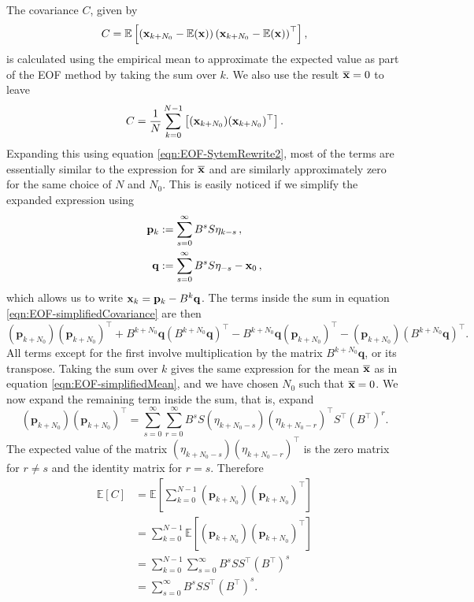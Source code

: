 The covariance $C$, given by 
\begin{align}
C = \mathbb{E}\left[ \left(\mathbf{x}_{k+N_0} - \mathbb{E}(\mathbf{x}) \right) \left(\mathbf{x}_{k+N_0} - \mathbb{E}(\mathbf{x}) \right)^\top \right],
\end{align}
is calculated using the empirical mean to approximate the expected value as part of the EOF method by taking the sum over $k$. We also use the result $\overline{\mathbf{x}}=0$ to leave
\begin{equation}
C = \frac{1}{N}\sum_{k=0}^{N-1}\left[ (\mathbf{x}_{k+N_0})(\mathbf{x}_{k+N_0})^\top \right].
\label{eqn:EOF-simplifiedCovariance}
\end{equation}
Expanding this using equation \ref{eqn:EOF-SytemRewrite2}, most of the terms are essentially similar to the expression for $\overline{\mathbf{x}}$ and are similarly approximately zero for the same choice of $N$ and $N_0$. This is easily noticed if we simplify the expanded expression using
\begin{align}
\mathbf{p}_k &:= \sum_{s=0}^{\infty} B^{s} S \mathbf{\eta}_{k-s}\,,\\
\mathbf{q} &:= \sum_{s=0}^{\infty} B^{s} S \mathbf{\eta}_{-s} - \mathbf{x}_0\,,
\end{align}
which allows us to write $\mathbf{x}_k = \mathbf{p}_k - B^k\mathbf{q}$. The terms inside the sum in equation \ref{eqn:EOF-simplifiedCovariance} are then
\begin{equation}
(\mathbf{p}_{k+N_0})(\mathbf{p}_{k+N_0})^\top + B^{k+N_0}\mathbf{q}(B^{k+N_0}\mathbf{q})^\top - B^{k+N_0}\mathbf{q}(\mathbf{p}_{k+N_0})^\top - (\mathbf{p}_{k+N_0}) (B^{k+N_0}\mathbf{q})^\top.
\end{equation}
All terms except for the first involve multiplication by the matrix $B^{k+N_0}\mathbf{q}$, or its transpose. Taking the sum over $k$ gives the same expression for the mean $\overline{\mathbf{x}}$ as in equation \ref{eqn:EOF-simplifiedMean}, and we have chosen $N_0$ such that $\overline{\mathbf{x}}=0$. We now expand the remaining term inside the sum, that is, expand
\begin{equation}
(\mathbf{p}_{k+N_0})(\mathbf{p}_{k+N_0})^\top = \sum_{s=0}^\infty \sum_{r=0}^\infty B^s S(\eta_{k+N_0-s})(\eta_{k+N_0-r})^\top S^\top (B^\top)^r.
\label{eqn:EOF-double_sum_expansion}
\end{equation}
The expected value of the matrix $(\eta_{k+N_0-s})(\eta_{k+N_0-r})^\top$ is the zero matrix for $r\neq s$ and the identity matrix for $r=s$. Therefore
\begin{align}
\mathbb{E}\left[C\right] &= 
\mathbb{E}\left[\sum_{k=0}^{N-1}(\mathbf{p}_{k+N_0})(\mathbf{p}_{k+N_0})^\top\right]\\
&= 
\sum_{k=0}^{N-1}\mathbb{E}\left[(\mathbf{p}_{k+N_0})(\mathbf{p}_{k+N_0})^\top\right]\\
&= \sum_{k=0}^{N-1}\sum_{s=0}^\infty B^s S S^\top (B^\top)^s\\
&= \sum_{s=0}^\infty B^s S S^\top (B^\top)^s.
\label{eqn:EOF-covarianceFinal}
\end{align}

